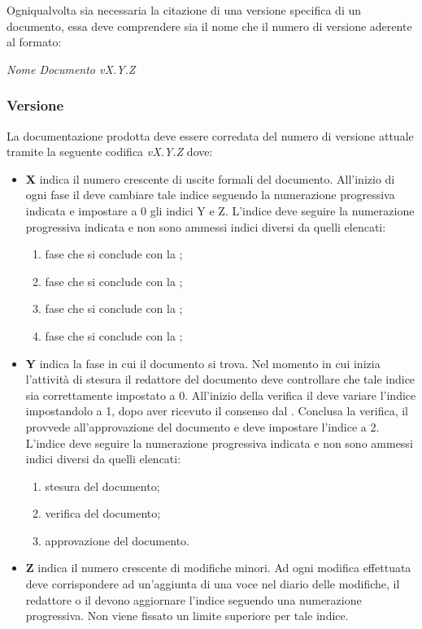 \documentclass[12pt,a4paper]{article}
\begin{document}
Ogniqualvolta sia necessaria la citazione di una versione specifica di un documento, essa deve comprendere sia il nome che il numero di versione aderente al formato:
\begin{center}
\emph{Nome Documento vX.Y.Z}
\end{center}

\subsubsection{Versione} \label{Versione}
La documentazione prodotta deve essere corredata del numero di versione attuale tramite la seguente codifica \emph{vX.Y.Z} dove:
\begin{itemize}
  \item \textbf{X} indica il numero crescente di uscite formali del documento. All'inizio di ogni fase il \PM deve cambiare tale indice seguendo la numerazione progressiva indicata e impostare a 0 gli indici Y e Z. L'indice deve seguire la numerazione progressiva indicata e non sono ammessi indici diversi da quelli elencati:
  \begin{enumerate}
    \item fase che si conclude con la \RR;
    \item fase che si conclude con la \RP;
    \item fase che si conclude con la \RQ;
    \item fase che si conclude con la \RA;
  \end{enumerate}
  \item \textbf{Y} indica la fase in cui il documento si trova. Nel momento in cui inizia l'attività di stesura il redattore del documento deve controllare che tale indice sia correttamente impostato a 0. All'inizio della verifica il \VR{} deve variare l'indice impostandolo a 1, dopo aver ricevuto il consenso dal \PM. Conclusa la verifica, il \PM{} provvede all'approvazione del documento e deve impostare l'indice a 2. L'indice deve seguire la numerazione progressiva indicata e non sono ammessi indici diversi da quelli elencati:
  \begin{enumerate}[start=0]
    \item stesura del documento;
    \item verifica del documento;
    \item approvazione del documento.
  \end{enumerate}
  \item \textbf{Z} indica il numero crescente di modifiche minori. Ad ogni modifica effettuata deve corrispondere ad un'aggiunta di una voce nel diario delle modifiche, il redattore o il \VR devono aggiornare l'indice seguendo una numerazione progressiva. Non viene fissato un limite superiore per tale indice.
\end{itemize}
\end{document}
